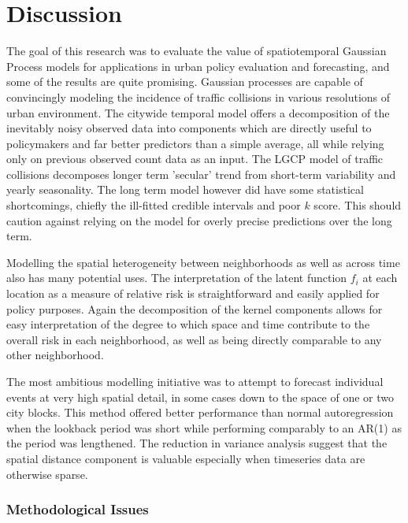 \chapter{Discussion}
\label{discussion}

The goal of this research was to evaluate the value of spatiotemporal Gaussian Process models for applications in urban policy evaluation and forecasting, and some of the results are quite promising. Gaussian processes are capable of convincingly modeling the incidence of traffic collisions in various resolutions of urban environment. The citywide temporal model offers a decomposition of the inevitably noisy observed data into components which are directly useful to policymakers and far better predictors than a simple average, all while relying only on previous observed count data as an input. The LGCP model of traffic collisions decomposes longer term 'secular' trend from short-term variability and yearly seasonality. The long term model however did have some statistical shortcomings, chiefly the ill-fitted credible intervals and poor $k$ score. This should caution against relying on the model for overly precise predictions over the long term. \par

Modelling the spatial heterogeneity between neighborhoods as well as across time also has many potential uses. The interpretation of the latent function $f_i$ at each location as a measure of relative risk is straightforward and easily applied for policy purposes. Again the decomposition of the kernel components allows for easy interpretation of the degree to which space and time contribute to the overall risk in each neighborhood, as well as being directly comparable to any other neighborhood. \par

The most ambitious modelling initiative was to attempt to forecast individual events at very high spatial detail, in some cases down to the space of one or two city blocks. This method offered better performance than normal autoregression when the lookback period was short while performing comparably to an AR(1) as the period was lengthened. The reduction in variance analysis suggest that the spatial distance component is valuable especially when timeseries data are otherwise sparse.

\subsection{Methodological Issues}

